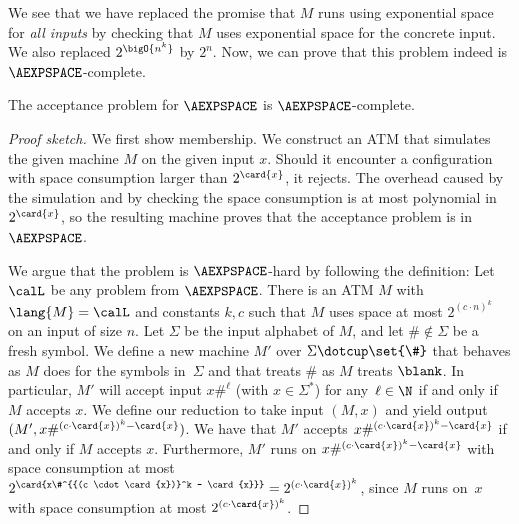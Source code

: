 \documentclass[../../diss.tex]{subfiles}
\begin{document}
\begin{problem}
\end{problem}

We see that we have replaced the promise that $M$ runs using exponential space for \emph{all inputs} by checking that $M$ uses exponential space for the concrete input.
We also replaced $2^{\bigO{n^k}}$ by $2^n$.
Now, we can prove that this problem indeed is $\AEXPSPACE$-complete.

\begin{lemma}%
\label{Lemma:ComplexityAEXPSPACEcompleteProblem}%
    The acceptance problem for $\AEXPSPACE$ is $\AEXPSPACE$-complete.
\end{lemma}

\begin{proof}[Proof sketch]
    We first show membership.
    We construct an ATM that simulates the given machine $M$ on the given input $x$.
    Should it encounter a configuration with space consumption larger than $2^{\card{x}}$, it rejects.
    The overhead caused by the simulation and by checking the space consumption is at most polynomial in $2^{\card{x}}$, so the resulting machine proves that the acceptance problem is in~$\AEXPSPACE$.

    We argue that the problem is $\AEXPSPACE$-hard by following the definition:
    Let $\calL$ be any problem from $\AEXPSPACE$.
    There is an ATM $M$ with $\lang{M} = \calL$ and constants $k, c$ such that $M$ uses space at most $2^{{(c \cdot n)}^k}$ on an input of size $n$.
    Let $\Sigma$ be the input alphabet of $M$, and let $\# \not\in \Sigma$ be a fresh symbol.
    We define a new machine $M'$ over $\Sigma \dotcup \set{\#}$ that behaves as $M$ does for the symbols in~$\Sigma$ and that treats $\#$ as $M$ treats $\blank$.
    In particular, $M'$ will accept input $x\#^\ell$ (with $x \in \Sigma^*$) for any~$\ell \in \N$ if and only if $M$ accepts $x$.
    We define our reduction to take input $(M,x)$ and yield output~$(M',x\#^{{(c \cdot \card{x})}^k - \card{x}})$.
    We have that $M'$ accepts $x\#^{{(c \cdot \card{x})}^k - \card{x}}$ if and only if $M$ accepts $x$.
    Furthermore, $M'$ runs on $x\#^{{(c \cdot \card{x})}^k - \card{x}}$ with space consumption at most $2^{\card{x\#^{{(c \cdot \card{x})}^k - \card{x}}}} = 2^{{(c \cdot \card{x})}^k}$, since $M$ runs on~$x$ with space consumption at most $2^{{(c \cdot \card{x})}^k}$.
\end{proof}
\end{document}
